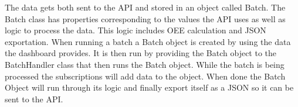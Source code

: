 The data gets both sent to the API and stored in an object called 
Batch. The Batch class  has properties 
corresponding to the values the API uses as well as logic to process the data. 
This logic includes OEE calculation and JSON exportation. When running a batch a 
Batch object is created by using the data the dashboard provides. It is then run 
by providing the Batch object to the BatchHandler class that then runs the Batch 
object. While the batch is being processed the subscriptions will add data to 
the object. When done the Batch Object will run through its logic and finally 
export itself as a JSON so it can be sent to the API. 
